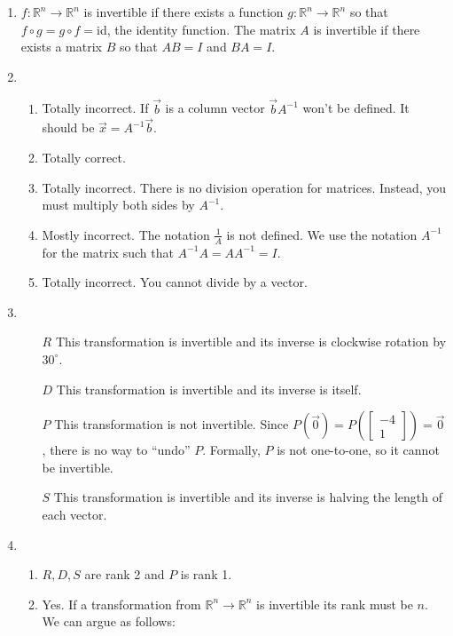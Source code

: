 \documentclass[red]{tutorial}
\newcommand{\R}{\mathbb{R}}
\newcommand{\mat}[1]{\begin{bmatrix}#1\end{bmatrix}}
\theoremstyle{definition}
\theoremstyle{theorem}
\begin{document}
	\begin{solutions}
		\begin{enumerate}
			\item $f:\R^n\to\R^n$ is invertible if there exists a function $g:\R^n\to\R^n$ so
				that $f\circ g=g\circ f=$id, the identity function. 
				The matrix $A$ is invertible if there exists a matrix $B$ so that
				$AB=I$ and $BA=I$.
			\item \begin{enumerate}
					\item Totally incorrect. If $\vec b$ is a column
						vector $\vec b A^{-1}$ won't be defined.
						It should be $\vec x=A^{-1}\vec b$.
					\item Totally correct.
					\item Totally incorrect. There is no division operation
						for matrices. Instead, you must multiply both sides by $A^{-1}$.
					\item Mostly incorrect. The notation $\tfrac{1}{A}$ is not defined. We
						use the notation $A^{-1}$ for the matrix such that $A^{-1}A=AA^{-1}=I$.
					\item Totally incorrect. You cannot divide by a vector.
			\end{enumerate}
			\item \begin{itemize}
					\item[$R$] This transformation is invertible and its inverse is
						clockwise rotation by $30^{\circ}$.
					\item[$D$] This transformation is invertible and its inverse is
						itself.
					\item[$P$] This transformation is not invertible. Since 
						$P(\vec 0) = P\left(\mat{-4\\1}\right)=\vec 0$, there
						is no way to ``undo'' $P$. Formally, $P$ is not one-to-one,
						so it cannot be invertible.
					\item[$S$] This transformation is invertible and its inverse is
						halving the length of each vector.
			\end{itemize}
			\item \begin{enumerate}
				\item $R,D,S$ are rank 2 and $P$ is rank 1.
				\item Yes. If a transformation from $\R^n\to\R^n$ is invertible 
					its rank must be $n$. We can argue as follows:


\end{enumerate}
\end{enumerate}
\end{solutions}
\end{document}
